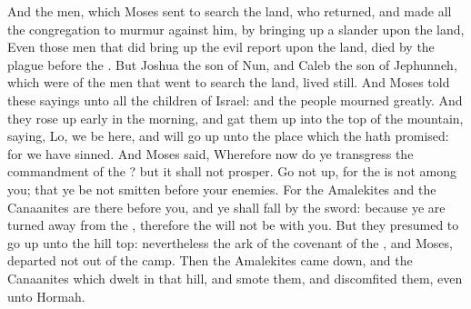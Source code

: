 \begin{biblechapter}
\verse And the men, which Moses sent to search the land, who returned, and made all the congregation to murmur against him, by bringing up a slander upon the land,
\verse Even those men that did bring up the evil report upon the land, died by the plague before the \LORD.
\verse But Joshua the son of Nun, and Caleb the son of Jephunneh, which were of the men that went to search the land, lived still.
\verse And Moses told these sayings unto all the children of Israel: and the people mourned greatly.
\verse And they rose up early in the morning, and gat them up into the top of the mountain, saying, Lo, we be here, and will go up unto the place which the \LORD hath promised: for we have sinned.
\verse And Moses said, Wherefore now do ye transgress the commandment of the \LORD? but it shall not prosper.
\verse Go not up, for the \LORD is not among you; that ye be not smitten before your enemies.
\verse For the Amalekites and the Canaanites are there before you, and ye shall fall by the sword: because ye are turned away from the \LORD, therefore the \LORD will not be with you.
\verse But they presumed to go up unto the hill top: nevertheless the ark of the covenant of the \LORD, and Moses, departed not out of the camp.
\verse Then the Amalekites came down, and the Canaanites which dwelt in that hill, and smote them, and discomfited them, even unto Hormah.
\end{biblechapter}

